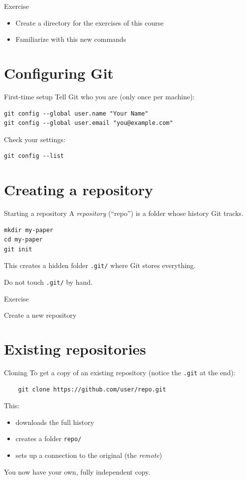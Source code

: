 \documentclass[11pt]{beamer}
\newcommand{\exercise}[1]{
  \begin{frame}{Exercise}
    #1
  \end{frame}
}
\begin{document}
\exercise{
  \begin{itemize}
  \item Create a directory for the exercises of this course
  \item Familiarize with this new commands
  \end{itemize}
}

\section{Configuring Git}

\begin{frame}[fragile]{First-time setup}
  Tell Git who you are (only once per machine):
\begin{lstlisting}
git config --global user.name "Your Name"
git config --global user.email "you@example.com"
\end{lstlisting}
  \vfill
  Check your settings:
\begin{lstlisting}
git config --list
\end{lstlisting}
\end{frame}

\section{Creating a repository}

\begin{frame}[fragile]{Starting a repository}
  A \emph{repository} (``repo'') is a folder whose history Git tracks.
\begin{lstlisting}
mkdir my-paper
cd my-paper
git init
\end{lstlisting}
\vfill
This creates a hidden folder \texttt{.git/} where Git stores everything.

  \alert{Do not touch \texttt{.git/} by hand.}
\end{frame}

\exercise{
  Create a new repository
}


\section{Existing repositories}

\begin{frame}[fragile]{Cloning}
  To get a copy of an existing repository (notice the \texttt{.git} at
  the end):
  \begin{lstlisting}
    git clone https://github.com/user/repo.git
  \end{lstlisting}
  This:
  \begin{itemize}
    \item downloads the full history
    \item creates a folder \texttt{repo/}
    \item sets up a connection to the original (the \emph{remote})
  \end{itemize}
  \vfill
  You now have your own, fully independent copy.
\end{frame}
\end{document}
